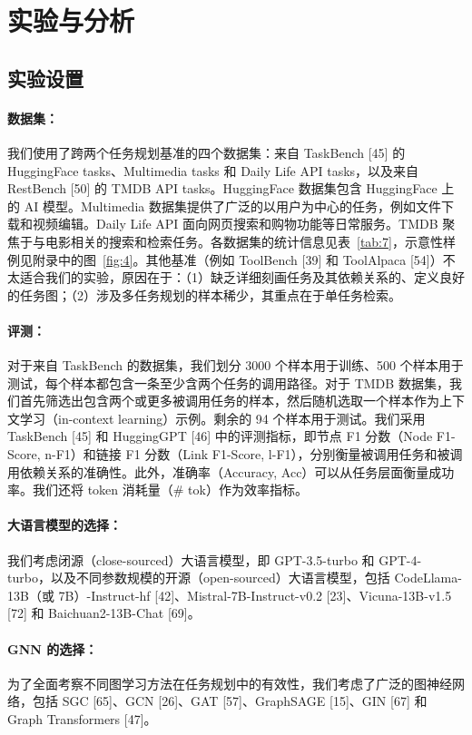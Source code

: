 \documentclass[11pt,UTF8,fontset=fandol]{ctexart}
\begin{document}
\section{实验与分析}
\subsection{实验设置}

\paragraph{数据集：}我们使用了跨两个任务规划基准的四个数据集：来自 TaskBench [45] 的 HuggingFace tasks、Multimedia tasks 和 Daily Life API tasks，以及来自 RestBench [50] 的 TMDB API tasks。HuggingFace 数据集包含 HuggingFace 上的 AI 模型。Multimedia 数据集提供了广泛的以用户为中心的任务，例如文件下载和视频编辑。Daily Life API 面向网页搜索和购物功能等日常服务。TMDB 聚焦于与电影相关的搜索和检索任务。各数据集的统计信息见表~\ref{tab:7}，示意性样例见附录中的图~\ref{fig:4}。其他基准（例如 ToolBench [39] 和 ToolAlpaca [54]）不太适合我们的实验，原因在于：（1）缺乏详细刻画任务及其依赖关系的、定义良好的任务图；（2）涉及多任务规划的样本稀少，其重点在于单任务检索。

\paragraph{评测：}对于来自 TaskBench 的数据集，我们划分 3000 个样本用于训练、500 个样本用于测试，每个样本都包含一条至少含两个任务的调用路径。对于 TMDB 数据集，我们首先筛选出包含两个或更多被调用任务的样本，然后随机选取一个样本作为上下文学习（in-context learning）示例。剩余的 94 个样本用于测试。我们采用 TaskBench [45] 和 HuggingGPT [46] 中的评测指标，即节点 F1 分数（Node F1-Score, n-F1）和链接 F1 分数（Link F1-Score, l-F1），分别衡量被调用任务和被调用依赖关系的准确性。此外，准确率（Accuracy, Acc）可以从任务层面衡量成功率。我们还将 token 消耗量（\# tok）作为效率指标。

\paragraph{大语言模型的选择：}我们考虑闭源（close-sourced）大语言模型，即 GPT-3.5-turbo 和 GPT-4-turbo，以及不同参数规模的开源（open-sourced）大语言模型，包括 CodeLlama-13B（或 7B）-Instruct-hf [42]、Mistral-7B-Instruct-v0.2 [23]、Vicuna-13B-v1.5 [72] 和 Baichuan2-13B-Chat [69]。

\paragraph{GNN 的选择：}为了全面考察不同图学习方法在任务规划中的有效性，我们考虑了广泛的图神经网络，包括 SGC [65]、GCN [26]、GAT [57]、GraphSAGE [15]、GIN [67] 和 Graph Transformers [47]。
\end{document}
